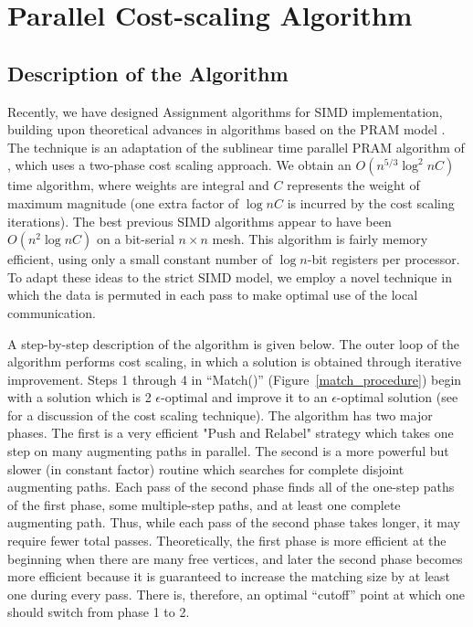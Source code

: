 \section{Parallel Cost-scaling Algorithm}
\label{scale}

\subsection{Description of the Algorithm}
\label{desc_cost_scale}

Recently, we have designed Assignment algorithms for SIMD 
implementation, building upon theoretical advances in algorithms 
based on the PRAM model \cite{br88}.  The technique is an adaptation of 
the sublinear time parallel PRAM algorithm of \cite{gpv88}, which uses 
a two-phase cost scaling approach.  We obtain an $O(n^{5/3} \log^2 n C)$ 
time algorithm, where weights are integral and $C$ represents 
the weight of maximum magnitude (one extra factor of $\log n C$ is 
incurred by the cost scaling iterations).  The best previous SIMD 
algorithms appear to have been $O(n^2 \log n C)$ on a bit-serial $n \times n$ 
mesh.  This algorithm is fairly memory efficient, using only a 
small constant number of $\log n$-bit registers per processor.  To 
adapt these ideas to the strict SIMD model, we employ a novel technique 
in which the data is permuted in each pass to make optimal use 
of the local communication.

A step-by-step description of the algorithm is given below.  The 
outer loop of the algorithm performs cost scaling, in which a solution 
is obtained through iterative improvement.  Steps 1 through 4 in ``Match()''
(Figure~\ref{match_procedure})
begin with a solution which is 2 $ \epsilon$-optimal and improve it to an 
$ \epsilon$-optimal solution (see \cite{be86}  for a discussion of the cost 
scaling technique).  The algorithm has two major phases.  The first is 
a very efficient "Push and Relabel" strategy which takes one step on 
many augmenting paths in parallel.  The second is a more powerful but 
slower (in constant factor) routine which searches for complete 
disjoint augmenting paths.  Each pass of the second phase finds all 
of the one-step paths of the first phase, some multiple-step paths, 
and at least one complete augmenting path.  Thus, while each pass of 
the second phase takes longer, it may require fewer total passes.  
Theoretically, the first phase is more efficient at the beginning 
when there are many free vertices, and later the second phase becomes more 
efficient because it is guaranteed to increase the matching 
size by at least one during every pass.  There is, therefore, an 
optimal ``cutoff'' point at which one should switch from phase 1 to 2.

